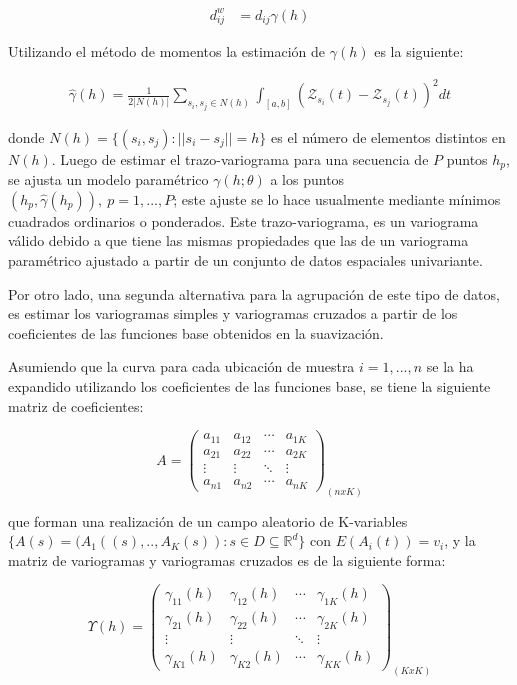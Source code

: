 \documentclass[
]{book}
\begin{document}
\begin{align*}
    d_{ij}^w&=d_{ij}\gamma(h)
\end{align*}

Utilizando el método de momentos la estimación de \(\gamma(h)\) es la siguiente:

\begin{align*}
    \hat{\gamma}(h)=\frac{1}{2 |N(h)|}\sum_{s_i,s_j\in N(h)}\int_{[a,b]}(\mathcal{Z}_{s_i}(t)-\mathcal{Z}_{s_j}(t))^2dt
\end{align*}

donde \(N(h)=\{(s_i, s_j): ||s_i -s_j||=h\}\) es el número de elementos distintos en \(N(h)\). Luego de estimar el trazo-variograma para una secuencia de \(P\) puntos \(h_p\), se ajusta un modelo paramétrico \(\gamma(h;\theta)\) a los puntos \((h_p,\hat{\gamma}(h_p)),\ p=1,...,P\); este ajuste se lo hace usualmente mediante mínimos cuadrados ordinarios o ponderados. Este trazo-variograma, es un variograma válido debido a que tiene las mismas propiedades que las de un variograma paramétrico ajustado a partir de un conjunto de datos espaciales univariante.

Por otro lado, una segunda alternativa para la agrupación de este tipo de datos, es estimar los variogramas simples y variogramas cruzados a partir de los coeficientes de las funciones base obtenidos en la suavización.

Asumiendo que la curva para cada ubicación de muestra \(i=1,...,n\) se la ha expandido utilizando los coeficientes de las funciones base, se tiene la siguiente matriz de coeficientes:

\begin{equation*}
A=
\begin{pmatrix}
a_{11} & a_{12} & \cdots & a_{1K}\\
a_{21} & a_{22} & \cdots & a_{2K}\\
\vdots & \vdots & \ddots & \vdots\\
a_{n1} & a_{n2} & \cdots & a_{nK}
\end{pmatrix}_{(nxK)}
\end{equation*}

que forman una realización de un campo aleatorio de K-variables \(\{A(s)=(A_1((s),..,A_K(s)): s\in D \subseteq \mathbb{R}^d\}\) con \(E(A_i(t))=v_i\), y la matriz de variogramas y variogramas cruzados es de la siguiente forma:

\begin{equation*}
\Upsilon(h)=
\begin{pmatrix}
\gamma_{11}(h) & \gamma_{12}(h) & \cdots & \gamma_{1K}(h)\\
\gamma_{21}(h) & \gamma_{22}(h) & \cdots & \gamma_{2K}(h)\\
\vdots & \vdots & \ddots & \vdots\\
\gamma_{K1}(h) & \gamma_{K2}(h) & \cdots & \gamma_{KK}(h)
\end{pmatrix}_{(KxK)}
\end{equation*}
\end{document}
